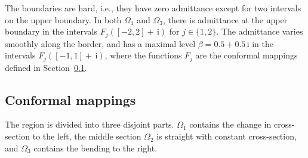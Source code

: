 \documentclass[numreferences]{kluwer}
\renewcommand{\i}{\,\mathrm{i}}
\begin{document}
The boundaries are hard, i.e., they have zero admittance except for
two intervals on the upper boundary. In both $\Omega_1$ and
$\Omega_3$, there is admittance at the upper boundary in the intervals
$F_j([-2,2]+\i)$ for $j\in\{1,2\}$. The admittance varies smoothly
along the border, and has a maximal level $\beta=0.5+0.5\i$ in the
intervals $F_j([-1,1]+\i)$, where the functions $F_j$ are the
conformal mappings defined in Section~\ref{sec:conformal-mappings}.

\subsection{Conformal mappings}
\label{sec:conformal-mappings}

The region is divided into three disjoint parts. $\Omega_1$ contains
the change in cross-section to the left, the middle section $\Omega_2$
is straight with constant cross-section, and $\Omega_3$ contains the
bending to the right.
\end{document}
